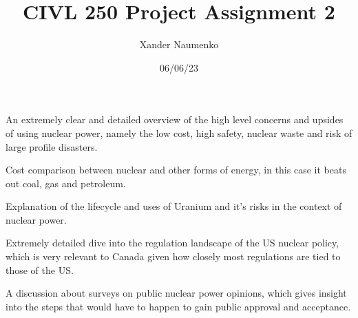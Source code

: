 \documentclass[letterpaper, reqno,11pt]{article}
\begin{document}
\title{CIVL 250 Project Assignment 2}
\date{06/06/23}
\author{Xander Naumenko}
\maketitle

\parencite{data}
\medskip

An extremely clear and detailed overview of the high level concerns and upsides of using nuclear power, namely the low cost, high safety, nuclear waste and risk of large profile disasters.

\medskip

\parencite{statista}
\medskip

Cost comparison between nuclear and other forms of energy, in this case it beats out coal, gas and petroleum.

\medskip

\parencite{institute}
\medskip

Explanation of the lifecycle and uses of Uranium and it's risks in the context of nuclear power.

\medskip

\parencite{world}
\medskip

Extremely detailed dive into the regulation landscape of the US nuclear policy, which is very relevant to Canada given how closely most regulations are tied to those of the US.

\medskip

\parencite{atomic}
\medskip

A discussion about surveys on public nuclear power opinions, which gives insight into the steps that would have to happen to gain public approval and acceptance.

\medskip

\printbibliography
\end{document}
